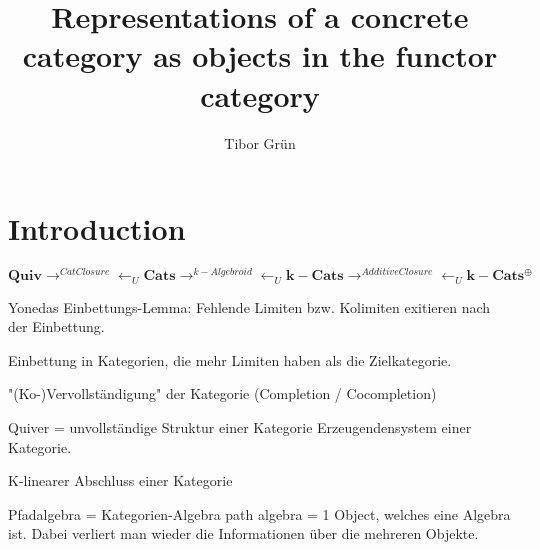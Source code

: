 \documentclass{article}
\title{Representations of a concrete category as objects in the functor category}
\author{Tibor Gr{\"u}n}
\theoremstyle{definition}
\begin{document}

	\maketitle

	\newpage

	\tableofcontents

	\newpage


%

\section{Introduction}

\[
\mathbf{Quiv}\rightarrow^{CatClosure}\leftarrow_{U}\mathbf{Cats}
\rightarrow^{k-Algebroid}\leftarrow_{U}\mathbf{k-Cats}
\rightarrow^{AdditiveClosure}\leftarrow_{U}\mathbf{k-Cats^{\oplus}}
\]










%



%





%



Yonedas Einbettungs-Lemma: Fehlende Limiten bzw. Kolimiten exitieren nach der Einbettung.

Einbettung in Kategorien, die mehr Limiten haben als die Zielkategorie.

"(Ko-)Vervollständigung" der Kategorie (Completion / Cocompletion)

Quiver = unvollständige Struktur einer Kategorie
Erzeugendensystem einer Kategorie.

K-linearer Abschluss einer Kategorie

Pfadalgebra = Kategorien-Algebra
path algebra = 1 Object, welches eine Algebra ist. Dabei verliert man wieder die Informationen über die
mehreren Objekte.
\end{document}
